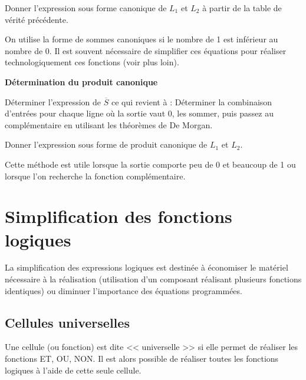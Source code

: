 \begin{exemple}
Donner l'expression sous forme canonique de $L_1$ et $L_2$ à partir de la table de vérité précédente. 
\end{exemple}

\begin{rem}
On utilise la forme de sommes canoniques si le nombre de 1 est inférieur au nombre de 0. Il est souvent nécessaire de simplifier ces équations pour réaliser technologiquement ces fonctions (voir plus loin).
\end{rem}

\begin{methode}
\textbf{Détermination du produit canonique}

Déterminer l'expression de $\overline{S}$ ce qui revient à :
Déterminer la combinaison d'entrées pour chaque ligne où la sortie vaut 0, les sommer, puis passez au complémentaire en utilisant les théorèmes de De Morgan. 
\end{methode}

\begin{exemple}
Donner l'expression sous forme de produit canonique de $L_1$ et $L_2$.
\end{exemple}

\begin{rem}
Cette méthode est utile lorsque la sortie comporte peu de 0 et beaucoup de 1 ou lorsque l'on recherche la fonction complémentaire. 
\end{rem}

\section{Simplification des fonctions logiques}
La simplification des expressions logiques est destinée à économiser le matériel nécessaire à la réalisation (utilisation d'un composant réalisant plusieurs fonctions identiques) ou diminuer l'importance des équations programmées.

\subsection{Cellules universelles}
\begin{defi}{}
Une cellule (ou fonction) est dite << universelle >> si elle permet de réaliser les fonctions ET, OU, NON. Il est alors possible de réaliser toutes les fonctions logiques à l'aide de cette seule cellule. 
\end{defi}

